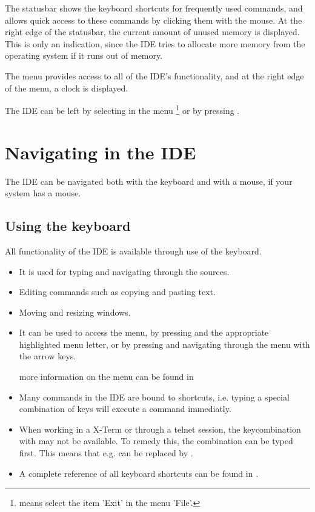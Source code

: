 The statusbar shows the keyboard shortcuts for frequently used 
commands, and allows quick access to these commands by clicking 
them with the mouse. 
At the right edge of the statusbar, the current amount of unused 
memory is displayed. This is only an indication, since the IDE 
tries to allocate more memory from the operating system if it 
runs out of memory.

The menu provides access to all of the IDE's functionality, and
at the right edge of the menu, a clock is displayed.

The IDE can be left by selecting  in the menu
\footnote{ means select the item 'Exit' in the menu 'File'.}
or by pressing .

\section{Navigating in the IDE}
The IDE can be navigated both with the keyboard and with a mouse, if your
system has a mouse.
%
%
\subsection{Using the keyboard} 
All functionality of the IDE is available through use of the keyboard.
\begin{itemize}
\item It is used for typing and navigating through the sources.
\item Editing commands such as copying and pasting text.
\item Moving and resizing windows.
\item It can be used to access the menu, by pressing  and the
appropriate highlighted menu letter, or by pressing  and
navigating through the menu with the arrow keys.

more information on the menu can be found in 
\item Many commands in the IDE are bound to shortcuts, i.e. typing a special
combination of keys will execute a command immediatly.
\end{itemize}
\begin{remark}
\begin{itemize}
\item When working in a \linux X-Term or through a telnet session, the
keycombination with  may not be available. To remedy this, the 
 combination can be typed first. This means that e.g. 
can be replaced by .
\item A complete reference of all keyboard shortcuts can be found in
.
\end{itemize}
\end{remark}
% 
%
